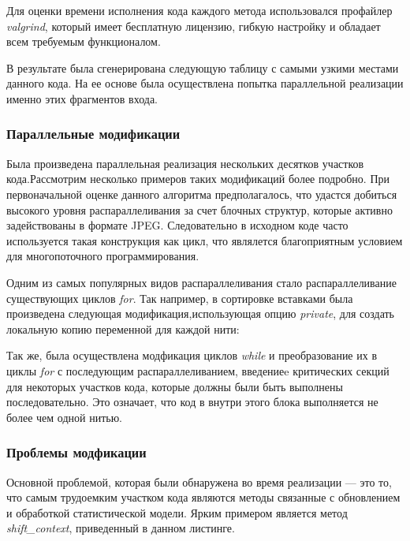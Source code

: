 \documentclass{matmex-diploma-custom}
\begin{document}
Для оценки времени исполнения кода каждого метода использовался профайлер \emph{valgrind}, который имеет бесплатную лицензию, гибкую настройку и обладает всем требуемым функционалом.

В результате была сгенерирована следующую таблицу с самыми узкими местами данного кода. На ее основе была осуществлена попытка параллельной реализации именно этих фрагментов входа.

\subsubsection{Параллельные модификации}
Была произведена параллельная реализация нескольких десятков участков кода.Рассмотрим несколько примеров таких модификаций более подробно.
При первоначальной оценке данного алгоритма предполагалось, что удастся добиться высокого уровня распараллеливания за счет блочных  структур, которые активно задействованы в формате JPEG. Следовательно в исходном коде часто используется такая конструкция как цикл, что являлется благоприятным условием для многопоточного программирования.

Одним из самых популярных видов распараллеливания стало распараллеливание существующих циклов \emph{for}. Так например, в сортировке вставками была произведена следующая модификация,использующая опцию \emph{private}, для создать локальную  копию переменной для каждой нити:


Так же, была осуществлена модфикация циклов \emph{while} и преобразование их в циклы \emph{for} с последующим распараллеливанием, введениеe критических секций для некоторых участков кода, которые должны были быть выполнены последовательно. Это означает, что код в внутри этого блока выполняется не более чем одной нитью.


\subsubsection{Проблемы модфикации}
Основной проблемой, которая были обнаружена во время реализации --- это то, что самым трудоемким участком кода являются методы связанные с обновлением и обработкой статистической модели. Ярким примером является метод \emph{shift\_context}, приведенный в данном листинге.
\end{document}
